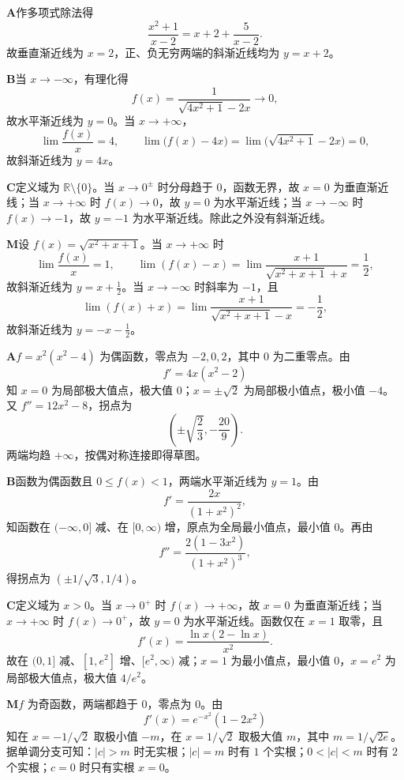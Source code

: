 \begin{solutionBox}
\textbf{A}\quad 作多项式除法得
\[
\frac{x^2+1}{x-2}=x+2+\frac5{x-2}.
\]
故垂直渐近线为 \(x=2\)，正、负无穷两端的斜渐近线均为 \(y=x+2\)。

\textbf{B}\quad 当 \(x\to-\infty\)，有理化得
\[
f(x)=\frac1{\sqrt{4x^2+1}-2x}\longrightarrow0,
\]
故水平渐近线为 \(y=0\)。当 \(x\to+\infty\)，
\[
\lim\frac{f(x)}x=4,\qquad
\lim\bigl(f(x)-4x\bigr)
=\lim\bigl(\sqrt{4x^2+1}-2x\bigr)=0,
\]
故斜渐近线为 \(y=4x\)。

\textbf{C}\quad 定义域为 \(\mathbb R\setminus\{0\}\)。当 \(x\to0^\pm\) 时分母趋于 \(0\)，函数无界，故 \(x=0\) 为垂直渐近线；当 \(x\to+\infty\) 时 \(f(x)\to0\)，故 \(y=0\) 为水平渐近线；当 \(x\to-\infty\) 时 \(f(x)\to-1\)，故 \(y=-1\) 为水平渐近线。除此之外没有斜渐近线。

\textbf{M}\quad 设 \(f(x)=\sqrt{x^2+x+1}\)。当 \(x\to+\infty\) 时
\[
\lim\frac{f(x)}x=1,\qquad
\lim(f(x)-x)
=\lim\frac{x+1}{\sqrt{x^2+x+1}+x}=\frac12,
\]
故斜渐近线为 \(y=x+\frac12\)。当 \(x\to-\infty\) 时斜率为 \(-1\)，且
\[
\lim(f(x)+x)
=\lim\frac{x+1}{\sqrt{x^2+x+1}-x}=-\frac12,
\]
故斜渐近线为 \(y=-x-\frac12\)。
\end{solutionBox}

\begin{solutionBox}
\textbf{A}\quad \(f=x^2(x^2-4)\) 为偶函数，零点为 \(-2,0,2\)，其中 \(0\) 为二重零点。由
\[
f'=4x(x^2-2)
\]
知 \(x=0\) 为局部极大值点，极大值 \(0\)；\(x=\pm\sqrt2\) 为局部极小值点，极小值 \(-4\)。又 \(f''=12x^2-8\)，拐点为
\[
\left(\pm\sqrt{\frac23},-\frac{20}{9}\right).
\]
两端均趋 \(+\infty\)，按偶对称连接即得草图。

\textbf{B}\quad 函数为偶函数且 \(0\le f(x)<1\)，两端水平渐近线为 \(y=1\)。由
\[
f'=\frac{2x}{(1+x^2)^2},
\]
知函数在 \((-\infty,0]\) 减、在 \([0,\infty)\) 增，原点为全局最小值点，最小值 \(0\)。再由
\[
f''=\frac{2(1-3x^2)}{(1+x^2)^3},
\]
得拐点为 \(\left(\pm1/\sqrt3,1/4\right)\)。

\textbf{C}\quad 定义域为 \(x>0\)。当 \(x\to0^+\) 时 \(f(x)\to+\infty\)，故 \(x=0\) 为垂直渐近线；当 \(x\to+\infty\) 时 \(f(x)\to0^+\)，故 \(y=0\) 为水平渐近线。函数仅在 \(x=1\) 取零，且
\[
f'(x)=\frac{\ln x(2-\ln x)}{x^2}.
\]
故在 \((0,1]\) 减、\([1,e^2]\) 增、\([e^2,\infty)\) 减；\(x=1\) 为最小值点，最小值 \(0\)，\(x=e^2\) 为局部极大值点，极大值 \(4/e^2\)。

\textbf{M}\quad \(f\) 为奇函数，两端都趋于 \(0\)，零点为 \(0\)。由
\[
f'(x)=e^{-x^2}(1-2x^2)
\]
知在 \(x=-1/\sqrt2\) 取极小值 \(-m\)，在 \(x=1/\sqrt2\) 取极大值 \(m\)，其中 \(m=1/\sqrt{2e}\)。据单调分支可知：\(|c|>m\) 时无实根；\(|c|=m\) 时有 \(1\) 个实根；\(0<|c|<m\) 时有 \(2\) 个实根；\(c=0\) 时只有实根 \(x=0\)。
\end{solutionBox}


